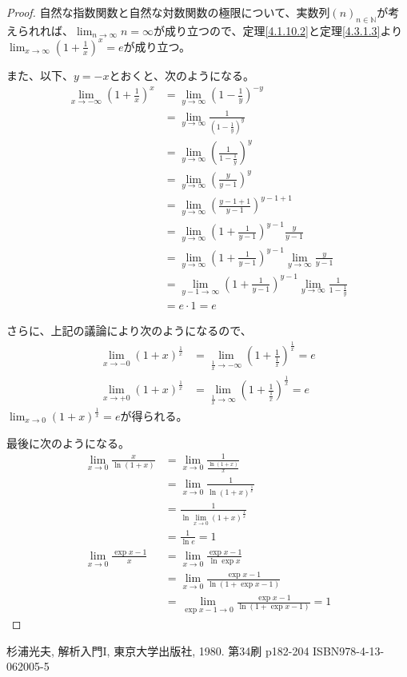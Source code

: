 \documentclass[dvipdfmx]{jsarticle}
\begin{document}
\begin{proof}
自然な指数関数と自然な対数関数の極限について、実数列$(n)_{n \in \mathbb{N}}$が考えられれば、$\lim_{n \rightarrow \infty}n = \infty$が成り立つので、定理\ref{4.1.10.2}と定理\ref{4.3.1.3}より$\lim_{x \rightarrow \infty}\left( 1 + \frac{1}{x} \right)^{x} = e$が成り立つ。\par
また、以下、$y = - x$とおくと、次のようになる。
\begin{align*}
\lim_{x \rightarrow - \infty}\left( 1 + \frac{1}{x} \right)^{x} &= \lim_{y \rightarrow \infty}\left( 1 - \frac{1}{y} \right)^{- y}\\
&= \lim_{y \rightarrow \infty}\frac{1}{\left( 1 - \frac{1}{y} \right)^{y}}\\
&= \lim_{y \rightarrow \infty}\left( \frac{1}{1 - \frac{1}{y}} \right)^{y}\\
&= \lim_{y \rightarrow \infty}\left( \frac{y}{y - 1} \right)^{y}\\
&= \lim_{y \rightarrow \infty}\left( \frac{y - 1 + 1}{y - 1} \right)^{y - 1 + 1}\\
&= \lim_{y \rightarrow \infty}{\left( 1 + \frac{1}{y - 1} \right)^{y - 1}\frac{y}{y - 1}}\\
&= \lim_{y \rightarrow \infty}\left( 1 + \frac{1}{y - 1} \right)^{y - 1}\lim_{y \rightarrow \infty}\frac{y}{y - 1}\\
&= \lim_{y - 1 \rightarrow \infty}\left( 1 + \frac{1}{y - 1} \right)^{y - 1}\lim_{y \rightarrow \infty}\frac{1}{1 - \frac{1}{y}}\\
&= e \cdot 1 = e
\end{align*}\par
さらに、上記の議論により次のようになるので、
\begin{align*}
\lim_{x \rightarrow - 0}(1 + x)^{\frac{1}{x}} &= \lim_{\frac{1}{x} \rightarrow - \infty}\left( 1 + \frac{1}{\frac{1}{x}} \right)^{\frac{1}{x}} = e\\
\lim_{x \rightarrow + 0}(1 + x)^{\frac{1}{x}} &= \lim_{\frac{1}{x} \rightarrow \infty}\left( 1 + \frac{1}{\frac{1}{x}} \right)^{\frac{1}{x}} = e
\end{align*}
$\lim_{x \rightarrow 0}(1 + x)^{\frac{1}{x}} = e$が得られる。\par
最後に次のようになる。
\begin{align*}
\lim_{x \rightarrow 0}\frac{x}{\ln(1 + x)} &= \lim_{x \rightarrow 0}\frac{1}{\frac{\ln(1 + x)}{x}}\\
&= \lim_{x \rightarrow 0}\frac{1}{\ln(1 + x)^{\frac{1}{x}}}\\
&= \frac{1}{\ln{\lim_{x \rightarrow 0}(1 + x)^{\frac{1}{x}}}}\\
&= \frac{1}{\ln e} = 1\\
\lim_{x \rightarrow 0}\frac{\exp x - 1}{x} &= \lim_{x \rightarrow 0}\frac{\exp x - 1}{\ln{\exp x}}\\
&= \lim_{x \rightarrow 0}\frac{\exp x - 1}{\ln\left( 1 + \exp x - 1 \right)}\\
&= \lim_{\exp x - 1 \rightarrow 0}\frac{\exp x - 1}{\ln\left( 1 + \exp x - 1 \right)} = 1
\end{align*}
\end{proof}
\begin{thebibliography}{50}
  杉浦光夫, 解析入門I, 東京大学出版社, 1980. 第34刷 p182-204 ISBN978-4-13-062005-5
\end{thebibliography}
\end{document}
